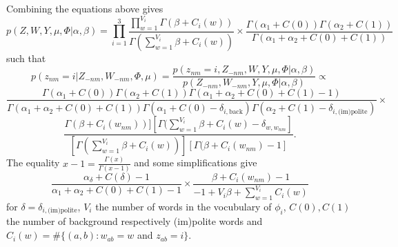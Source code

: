 \documentclass[11pt, english]{article}
\begin{document}
Combining the equations above gives
\[
p(Z,W,Y,\mu,\Phi|\alpha,\beta)= \prod_{i=1}^3 \frac{\prod_{w=1}^{V_i}\Gamma(\beta+C_i(w))}{\Gamma(\sum_{w=1}^{V_i}\beta+C_i(w))}\times \frac{\Gamma(\alpha_1+C(0))\Gamma(\alpha_2+C(1))}{\Gamma(\alpha_1+\alpha_2+C(0)+C(1))}
\]
such that 
\[
p(z_{nm}=i|Z_{-nm}, W_{-nm}, \Phi,\mu)= \frac{p(z_{nm}=i,Z_{-nm},W,Y,\mu,\Phi|\alpha,\beta)}{p(Z_{-nm},W_{-nm},Y,\mu,\Phi|\alpha,\beta)}\propto
\]
\[
\frac{\Gamma(\alpha_1+C(0))\Gamma(\alpha_2+C(1))\Gamma(\alpha_1+\alpha_2+C(0)+C(1)-1)}{\Gamma(\alpha_1+\alpha_2+C(0)+C(1))\Gamma(\alpha_1+C(0)-\delta_{i,\text{back}})\Gamma(\alpha_2+C(1)-\delta_{i,\text{(im)polite}})} \times
\]
\[
\frac{\Gamma(\beta+C_i(w_{nm}))][\Gamma(\sum_{w=1}^{V_i}\beta+C_i(w)-\delta_{w,w_{nm}}]}{[\Gamma(\sum_{w=1}^{V_i}\beta+C_i(w))][\Gamma(\beta+C_i(w_{nm})-1]}.
\]
The equality $x-1=\frac{\Gamma(x)}{\Gamma(x-1)}$ and some simplifications give
\[
\frac{\alpha_\delta+C(\delta)-1}{\alpha_1+\alpha_2+C(0)+C(1)-1}
\times \frac{\beta+C_i(w_{nm})-1}{-1+V_i\beta + \sum_{w=1}^{V_i} C_i(w)}
\]
for $\delta = \delta_{i,\text{(im)polite}}$, $V_i$ the number of words in the vocubulary of $\phi_i$, $C(0),C(1)$ the number of background respectively (im)polite words and $C_i(w) = \#\{(a,b):w_{ab}=w$ and $z_{ab}=i\}$.
\end{document}
